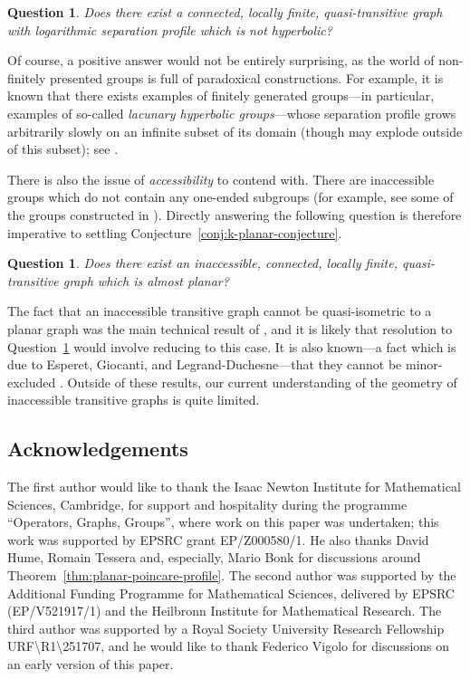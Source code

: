 \documentclass[11pt,a4paper]{amsart}
\newtheorem{question}[theorem]{Question}
\theoremstyle{definition}
\begin{document}
\begin{question}\label{question:log-sep}
    Does there exist a connected, locally finite, quasi-transitive graph with logarithmic separation profile which is not hyperbolic?
\end{question}

Of course, a positive answer would not be entirely surprising, as the world of non-finitely presented groups is full of paradoxical constructions. For example, it is known that there exists examples of finitely generated groups---in particular, examples of so-called \emph{lacunary hyperbolic groups}---whose separation profile grows arbitrarily slowly on an infinite subset of its domain (though may explode outside of this subset); see \cite[Thm.~1.4]{hume2020poorly}. 


There is also the issue of \emph{accessibility} to contend with. There are inaccessible groups which do not contain any one-ended subgroups (for example, see some of the groups constructed in \cite{dunwoody1993inaccessible}). Directly answering the following question is therefore imperative to settling Conjecture~\ref{conj:k-planar-conjecture}.


\begin{question}\label{question:inaccessible}
    Does there exist an inaccessible, connected, locally finite, quasi-transitive graph which is almost planar?
\end{question}

The fact that an inaccessible transitive graph cannot be quasi-isometric to a planar graph was the main technical result of \cite{macmanus2023accessibility}, and it is likely that resolution to Question~\ref{question:inaccessible} would involve reducing to this case. It is also known---a fact which is due to Esperet, Giocanti, and Legrand-Duchesne---that they cannot be minor-excluded \cite{esperet2024structure}. Outside of these results, our current understanding of the geometry of inaccessible transitive graphs is quite limited. 


\subsection*{Acknowledgements}

The first author would like to thank the Isaac Newton Institute for Mathematical Sciences, Cambridge, for support and hospitality during the programme ``Operators, Graphs, Groups'', where work on this paper was undertaken; this work was supported by EPSRC grant EP/Z000580/1.
He also thanks David Hume, Romain Tessera and, especially, Mario Bonk for discussions around Theorem~\ref{thm:planar-poincare-profile}.
The second author was supported by the Additional Funding Programme for Mathematical Sciences, delivered by EPSRC (EP/V521917/1) and the Heilbronn Institute for Mathematical Research. The third author was supported by a Royal Society University Research Fellowship  URF\textbackslash R1\textbackslash 251707, and he would like to thank Federico Vigolo for discussions on an early version of this paper.  
\end{document}
